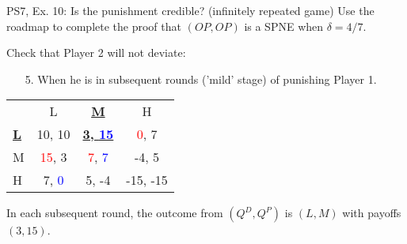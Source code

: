 \begin{frame}{PS7, Ex. 10: Is the punishment credible? (infinitely repeated game)}
  Use the roadmap to complete the proof that $(OP,OP)$ is a SPNE when $\delta=4/7$.\vspace{-4pt}
  \begin{multicols}{2}
    Check that Player 2 will not deviate:
    \begin{itemize}
      \item[5.] When he is in subsequent rounds ('mild' stage) of punishing Player 1.
    \end{itemize}
    \vfill\null\columnbreak
    \vspace{-6pt}
    \begin{table}
      \begin{tabular}{l|c|c|c|}
        \multicolumn{1}{c}{} & \multicolumn{1}{c}{L} & \multicolumn{1}{c}{\textbf{\underline{M}}} & \multicolumn{1}{c}{H} \\\cline{2-4}
        \textbf{\underline{L}} & 10, 10 & \textbf{\underline{3, \textcolor{blue}{15}}} & \textcolor{red}{0}, 7 \\\cline{2-4}
        M & \textcolor{red}{15}, 3 & \textcolor{red}{7}, \textcolor{blue}{7} & -4, 5 \\\cline{2-4}
        H & 7, \textcolor{blue}{0} & 5, -4 & -15, -15 \\\cline{2-4}
      \end{tabular}
    \end{table}
    \vspace{-8pt}
  \end{multicols}
    In each subsequent round, the outcome from $(Q^D,Q^P)$ is $(L,M)$ with payoffs $(3,15)$.\\\medskip
    \vfill\null
\end{frame}

